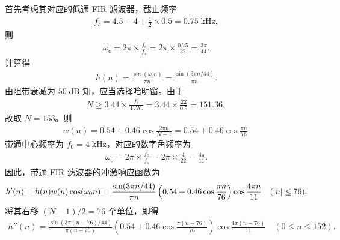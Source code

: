 \begin{solution}
    首先考虑其对应的低通 FIR 滤波器，截止频率
    \begin{align*}
        f_c = 4.5 - 4 + \frac{1}{2} \times 0.5 = 0.75\;\mathrm{kHz},
    \end{align*}
    则
    \begin{align*}
        \omega_c = 2\pi \times \frac{f_c}{f_s} = 2\pi \times \frac{0.75}{22} = \frac{3\pi}{44}.
    \end{align*}
    计算得
    \begin{align*}
        h(n) = \frac{\sin(\omega_c n)}{\pi n} = \frac{\sin(3\pi n / 44)}{\pi n}.
    \end{align*}
    由阻带衰减为 $50\;\mathrm{dB}$ 知，应当选择哈明窗。由于
    \begin{align*}
        N \ge 3.44 \times \frac{f_s}{\text{T.W.}} = 3.44 \times \frac{22}{0.5} = 151.36,
    \end{align*}
    故取 $N = 153$。则
    \begin{align*}
        w(n) = 0.54 + 0.46\cos\frac{2\pi n}{N - 1} = 0.54 + 0.46\cos\frac{\pi n}{76}.
    \end{align*}
    带通中心频率为 $f_0 = 4\;\mathrm{kHz}$，对应的数字角频率为
    \begin{align*}
        \omega_0 = 2\pi \times \frac{f_0}{f_s} = 2\pi \times \frac{4}{22} = \frac{4\pi}{11}.
    \end{align*}
    因此，带通 FIR 滤波器的冲激响应函数为
    \begin{align*}
        h'(n) = h(n) w(n) \cos(\omega_0 n) = \frac{\sin(3\pi n / 44)}{\pi n} \left(0.54 + 0.46\cos\frac{\pi n}{76}\right) \cos\frac{4\pi n}{11} \quad (\left|n\right| \le 76).
    \end{align*}
    将其右移 $(N - 1) / 2 = 76$ 个单位，即得
    \begin{align*}
        h''(n) = \frac{\sin(3\pi (n - 76) / 44)}{\pi (n - 76)} \left(0.54 + 0.46\cos\frac{\pi (n - 76)}{76}\right) \cos\frac{4\pi (n - 76)}{11} \quad (0 \le n \le 152).
    \end{align*}
\end{solution}

